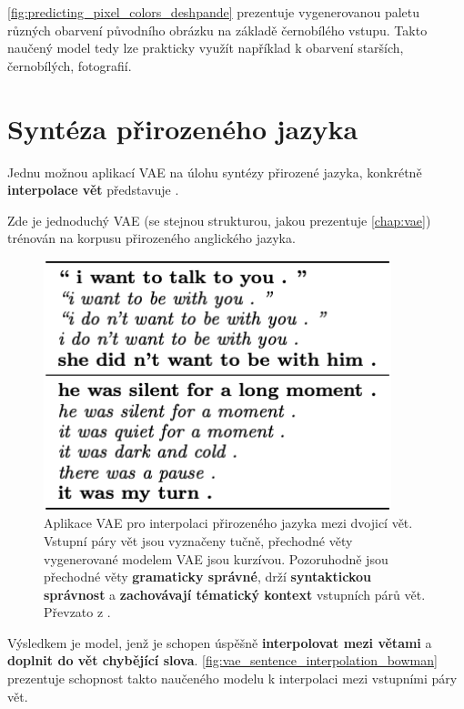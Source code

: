 \autoref{fig:predicting_pixel_colors_deshpande} prezentuje vygenerovanou paletu různých obarvení původního obrázku na základě černobílého vstupu.
Takto naučený model tedy lze prakticky využít například k obarvení starších, černobílých, fotografií.

\newpage
\section{Syntéza přirozeného jazyka}
Jednu možnou aplikací VAE na úlohu syntézy přirozené jazyka, konkrétně \textbf{interpolace vět} představuje \cite{Bowman2016}.

Zde je jednoduchý VAE (se stejnou strukturou, jakou prezentuje \autoref{chap:vae}) trénován na korpusu přirozeného anglického jazyka.

\begin{figure}[H]
    \centering
    \includegraphics[width=0.9\textwidth]{figures/applications/vae_sentence_interpolation_bowman.png}
    \caption{Aplikace VAE pro interpolaci přirozeného jazyka mezi dvojicí vět. Vstupní páry vět jsou vyznačeny tučně, přechodné věty vygenerované modelem VAE jsou kurzívou.
    Pozoruhodně jsou přechodné věty \textbf{gramaticky správné}, drží \textbf{syntaktickou správnost} a \textbf{zachovávají tématický kontext} vstupních párů vět. Převzato z \cite{Bowman2016}.}
    \label{fig:vae_sentence_interpolation_bowman}
\end{figure}

Výsledkem je model, jenž je schopen úspěšně \textbf{interpolovat mezi větami} a \textbf{doplnit do vět chybějící slova}. \autoref{fig:vae_sentence_interpolation_bowman} prezentuje schopnost takto naučeného modelu k interpolaci mezi vstupními páry vět. \cite{Bowman2016}

